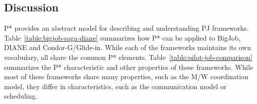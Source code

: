 \documentclass[conference]{IEEEtran}
\begin{document}
% 
% 


\subsection{Discussion}


P* provides an abstract model for describing and understanding PJ
frameworks. Table~\ref{table:bigjob-saga-diane} summarizes how P* can
be applied to BigJob, DIANE and Condor-G/Glide-in. While each of 
the frameworks maintains its own vocabulary, all share the common P* elements. 
Table~\ref{table:pilot-job-comparison} summarizes the P* characteristic and 
other properties of these frameworks. While most of these frameworks share many 
properties, such as the M/W coordination model, they differ in characteristics, 
such as the communication model or scheduling.
\end{document}
